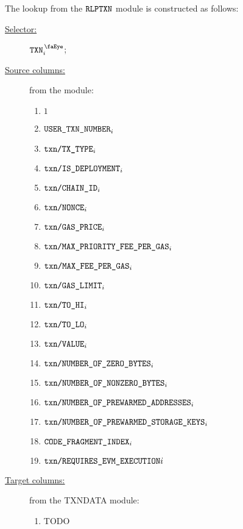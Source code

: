 The lookup from the $\texttt{RLPTXN}$ module is constructed as follows:
\begin{description}
	\item[\underline{Selector:}] $\isTxn_{i}$;
	\item[\underline{Source columns:}] from the \rlpTxnMod{} module:
	\begin{multicols}{3}
	\begin{enumerate}
		\item $1$
		\item $\texttt{USER}\texttt{\_}\texttt{TXN\_NUMBER}_{i}$
		\item $\texttt{txn}\texttt{/}\texttt{{TX\_TYPE}}{}_{i}$
		\item $\texttt{txn}\texttt{/}\texttt{{IS\_DEPLOYMENT}}{}_{i}$
		\item $\texttt{txn}\texttt{/}\texttt{{CHAIN\_ID}}{}_{i}$
		\item $\texttt{txn}\texttt{/}\texttt{{\texttt{NONCE}}}{}_{i}$
		\item $\texttt{txn}\texttt{/}\texttt{{GAS\_PRICE}}{}_{i}$
		\item $\texttt{txn}\texttt{/}\texttt{{MAX\_PRIORITY\_FEE\_PER\_GAS}}{}_{i}$
		\item $\texttt{txn}\texttt{/}\texttt{{MAX\_FEE\_PER\_GAS}}{}_{i}$
		\item $\texttt{txn}\texttt{/}\texttt{{GAS\_LIMIT}}{}_{i}$
		\item $\texttt{txn}\texttt{/}\texttt{{TO\_HI}}{}_{i}$
		\item $\texttt{txn}\texttt{/}\texttt{{TO\_LO}}{}_{i}$
		\item $\texttt{txn}\texttt{/}\texttt{{VALUE}}{}_{i}$
		\item $\texttt{txn}\texttt{/}\texttt{{NUMBER\_OF\_ZERO\_BYTES}}{}_{i}$
		\item $\texttt{txn}\texttt{/}\texttt{{NUMBER\_OF\_NONZERO\_BYTES}}{}_{i}$
		\item $\texttt{txn}\texttt{/}\texttt{{NUMBER\_OF\_PREWARMED\_ADDRESSES}}{}_{i}$
		\item $\texttt{txn}\texttt{/}\texttt{{NUMBER\_OF\_PREWARMED\_STORAGE\_KEYS}}{}_{i}$
		\item $\texttt{CODE\_FRAGMENT\_INDEX}{}_{i}$
		\item $\texttt{txn}\texttt{/}\texttt{{REQUIRES\_EVM\_EXECUTION}}{}{i}$
	\end{enumerate}
	\end{multicols}
\item[\underline{Target columns:}] from the TXNDATA module: 
	\begin{multicols}{3}
	\begin{enumerate}
		\item TODO
	\end{enumerate} 
	\end{multicols}
\end{description}